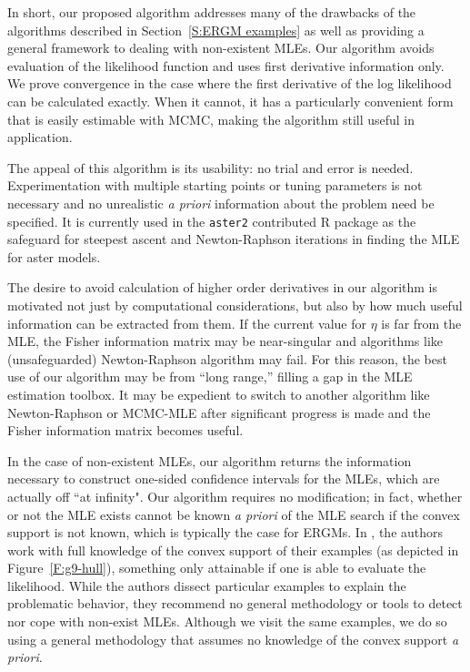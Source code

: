 In short, our proposed algorithm addresses many of the drawbacks of the algorithms
described in Section~\ref{S:ERGM examples} as well as providing a general framework
to dealing with non-existent MLEs.  Our algorithm avoids evaluation of the likelihood function and uses first derivative information only.  
We prove convergence in the case where the first derivative of the log likelihood
can be calculated exactly.
When it cannot, it has a particularly convenient form that is 
easily estimable with MCMC, making the algorithm still useful in application.

The appeal of this algorithm is its usability: no trial and error is needed.  
Experimentation with multiple starting points or tuning parameters is not necessary 
and no unrealistic \emph{a priori} information about the problem need be specified.  
It is currently used in the \texttt{aster2} contributed R package 
\citep{aster:R} as the safeguard for steepest ascent and Newton-Raphson iterations in finding the MLE for aster models.

The desire to avoid calculation of higher order derivatives in our algorithm
is motivated not just by 
computational considerations, but 
also by how much useful information can be extracted from them.   
If the current value for $\eta$ is far from the MLE,  
the Fisher information matrix may be near-singular and algorithms like (unsafeguarded) 
Newton-Raphson algorithm may fail.  
For this 
reason, the best use of our algorithm may be from ``long range,'' filling a gap in the MLE estimation toolbox.  It may 
be expedient to switch to another algorithm like Newton-Raphson or MCMC-MLE 
after significant progress is made and the Fisher information matrix becomes useful.  


In the case of non-existent MLEs, our algorithm returns the information necessary
to construct one-sided confidence intervals for the MLEs, which are actually off 
``at infinity".  Our algorithm requires no modification; in fact,
whether or not the MLE exists cannot be known \emph{a priori} 
of the MLE search if the convex support is not known, which is typically the case
for ERGMs.
In \citet{Handcock:degeneracy,Rinaldo:2009}, the authors work with full knowledge of 
the convex support of their examples (as depicted in Figure~\ref{F:g9-hull}), something only attainable if one is able to
evaluate the likelihood.  While the authors dissect particular examples 
to explain the problematic behavior, they recommend no general methodology 
or tools to detect nor cope with non-exist MLEs.  Although we visit the same
examples, we do so using a general methodology that assumes no knowledge of the 
convex support \emph{a priori}.




